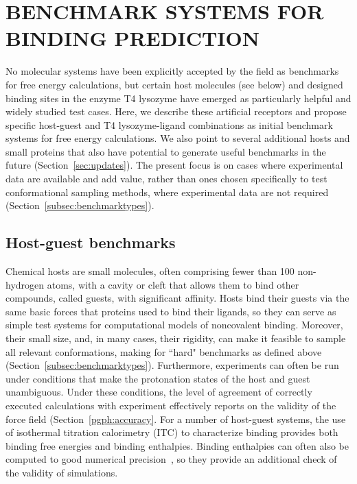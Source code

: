 \documentclass[aps,pre,twocolumn,nofootinbib,superscriptaddress,10pt, final,tightenlines]{revtex4-1}
\begin{document}
\section{BENCHMARK SYSTEMS FOR BINDING PREDICTION}
\label{benchmarks}
No molecular systems have been explicitly accepted by the field as benchmarks for free energy calculations, but certain host molecules (see below) and designed binding sites in the enzyme T4 lysozyme have emerged as particularly helpful and widely studied test cases. 
Here, we describe these artificial receptors and propose specific host-guest and T4 lysozyme-ligand combinations as initial benchmark systems for free energy calculations. 
We also point to several additional hosts and small proteins that also have potential to generate useful benchmarks in the future (Section~\ref{sec:updates}). 
The present focus is on cases where experimental data are available and add value, rather than ones chosen specifically to test conformational sampling methods, where experimental data are not required (Section~\ref{subsec:benchmarktypes}). 

\subsection{Host-guest benchmarks}
Chemical hosts are small molecules, often comprising fewer than 100 non-hydrogen atoms, with a cavity or cleft that allows them to bind other compounds, called guests, with significant affinity.  
Hosts bind their guests via the same basic forces that proteins used to bind their ligands, so they can serve as simple test systems for computational models of noncovalent binding. 
Moreover, their small size, and, in many cases, their rigidity, can make it feasible to sample all relevant conformations, making for ``hard" benchmarks as defined above (Section~\ref{subsec:benchmarktypes}).  
Furthermore, experiments can often be run under conditions that make the protonation states of the host and guest unambiguous. Under these conditions, the level of agreement of correctly executed calculations with experiment effectively reports on the validity of the force field (Section~\ref{pgph:accuracy}. 
For a number of host-guest systems, the use of isothermal titration calorimetry (ITC) to characterize binding provides both binding free energies and binding enthalpies. 
Binding enthalpies can often also be computed to good numerical precision~\cite{henriksen_computational_2015}, so they provide an additional check of the validity of simulations. 
\end{document}
